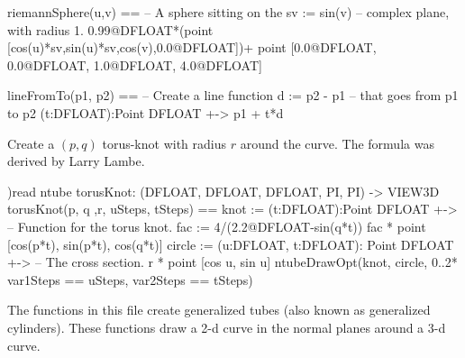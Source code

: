 \begin{xmpLinesNoResetPlain}
riemannSphere(u,v) ==                                    -- A sphere sitting on the
  sv := sin(v)                                           -- \quad{}complex plane, with radius 1.
  0.99@DFLOAT*(point [cos(u)*sv,sin(u)*sv,cos(v),0.0@DFLOAT])+
    point [0.0@DFLOAT, 0.0@DFLOAT, 1.0@DFLOAT, 4.0@DFLOAT]

lineFromTo(p1, p2) ==                                    -- Create a line function
  d := p2 - p1                                           -- \quad{}that goes from p1 to p2
  (t:DFLOAT):Point DFLOAT +->
    p1 + t*d
\end{xmpLinesNoResetPlain}

%
%
Create a $(p,q)$ torus-knot with radius $r$ around the curve.
The formula was derived by Larry Lambe.

\begin{xmpLinesPlain}
)read ntube
torusKnot: (DFLOAT, DFLOAT, DFLOAT, PI, PI) -> VIEW3D
torusKnot(p, q ,r, uSteps, tSteps) ==
  knot := (t:DFLOAT):Point DFLOAT +->                    -- Function for the torus knot.
    fac := 4/(2.2@DFLOAT-sin(q*t))
    fac * point [cos(p*t), sin(p*t), cos(q*t)]
  circle := (u:DFLOAT, t:DFLOAT): Point DFLOAT +->       -- The cross section.
    r * point [cos u, sin u]
  ntubeDrawOpt(knot, circle, 0..2*%
               var1Steps == uSteps, var2Steps == tSteps)

\end{xmpLinesPlain}

%
%
The functions in this file create generalized tubes (also known as generalized
cylinders).
These functions draw a 2-d curve in the normal
planes around a 3-d curve.

